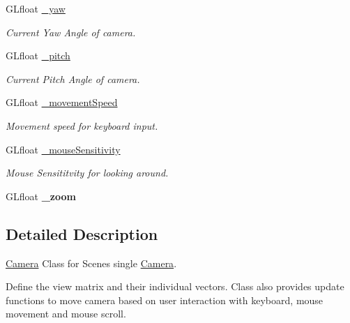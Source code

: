 \begin{DoxyCompactItemize}
\hypertarget{class_camera_ab815461cc043db1f5810c2f488641740}{}\label{class_camera_ab815461cc043db1f5810c2f488641740} 
G\+Lfloat \hyperlink{class_camera_ab815461cc043db1f5810c2f488641740}{\+\_\+yaw}
\begin{DoxyCompactList}\small\item\em Current Yaw Angle of camera. \end{DoxyCompactList}\item 
\hypertarget{class_camera_a23a8b8859c44721d7082b89809318918}{}\label{class_camera_a23a8b8859c44721d7082b89809318918} 
G\+Lfloat \hyperlink{class_camera_a23a8b8859c44721d7082b89809318918}{\+\_\+pitch}
\begin{DoxyCompactList}\small\item\em Current Pitch Angle of camera. \end{DoxyCompactList}\item 
\hypertarget{class_camera_aa67131dd5d972aa4c1f6417c04c848c6}{}\label{class_camera_aa67131dd5d972aa4c1f6417c04c848c6} 
G\+Lfloat \hyperlink{class_camera_aa67131dd5d972aa4c1f6417c04c848c6}{\+\_\+movement\+Speed}
\begin{DoxyCompactList}\small\item\em Movement speed for keyboard input. \end{DoxyCompactList}\item 
\hypertarget{class_camera_a280396788c971d3470d676a170b176ba}{}\label{class_camera_a280396788c971d3470d676a170b176ba} 
G\+Lfloat \hyperlink{class_camera_a280396788c971d3470d676a170b176ba}{\+\_\+mouse\+Sensitivity}
\begin{DoxyCompactList}\small\item\em Mouse Sensititvity for looking around. \end{DoxyCompactList}\item 
\hypertarget{class_camera_a99dc4d95f58be2427ff6c8d93c676ecd}{}\label{class_camera_a99dc4d95f58be2427ff6c8d93c676ecd} 
G\+Lfloat {\bfseries \+\_\+zoom}
\end{DoxyCompactItemize}


\subsection{Detailed Description}
\hyperlink{class_camera}{Camera} Class for Scene\textquotesingle{}s single \hyperlink{class_camera}{Camera}. 

Define the view matrix and their individual vectors. Class also provides update functions to move camera based on user interaction with keyboard, mouse movement and mouse scroll. 

